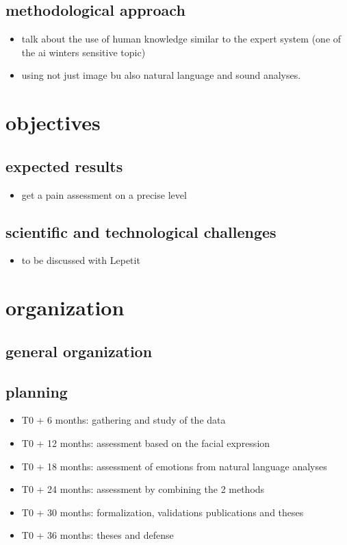\documentclass[11pt]{article}
\begin{document}
\subsection{methodological approach}
\label{sec:org9ba0b98}
\begin{itemize}
\item talk about the use of human knowledge similar to the expert system (one of the ai winters sensitive topic)
\item using not just image bu also natural language and sound analyses.
\end{itemize}

\section{objectives}
\label{sec:org310d50e}
\subsection{expected results}
\label{sec:orgbe4a346}
\begin{itemize}
\item get a pain assessment on a precise level
\end{itemize}
\subsection{scientific and technological challenges}
\label{sec:org1c8f38c}
\begin{itemize}
\item to be discussed with Lepetit
\end{itemize}
\section{organization}
\label{sec:orgde7aa5c}
\subsection{general organization}
\label{sec:orgc03a989}
\subsection{planning}
\label{sec:orgaa41bec}

\begin{itemize}
\item T0 + 6  months: gathering and study of the data

\item T0 + 12 months: assessment based on the facial expression

\item T0 + 18 months: assessment of emotions from natural language analyses

\item T0 + 24 months: assessment by combining the 2 methods

\item T0 + 30 months: formalization, validations publications and theses

\item T0 + 36 months: theses and defense
\end{itemize}





\end{document}
